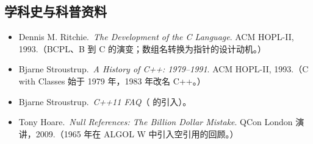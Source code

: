 \subsection*{学科史与科普资料}
\begin{itemize}
  \item Dennis M. Ritchie.\ \emph{The Development of the C Language}. ACM HOPL-II, 1993.（BCPL、B 到 C 的演变；数组名转换为指针的设计动机。）
  \item Bjarne Stroustrup.\ \emph{A History of C++: 1979--1991}. ACM HOPL-II, 1993.（C with Classes 始于 1979 年，1983 年改名 C++。）
  \item Bjarne Stroustrup.\ \emph{C++11 FAQ}（ 的引入）。
  \item Tony Hoare.\ \emph{Null References: The Billion Dollar Mistake}. QCon London 演讲，2009.（1965 年在 ALGOL W 中引入空引用的回顾。）
\end{itemize}
